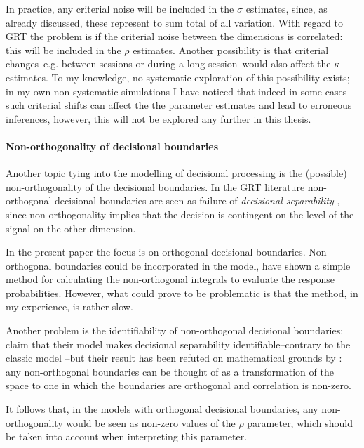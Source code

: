 \documentclass{article}\usepackage{knitr}
\begin{document}
In practice, any criterial noise will be included in the $\sigma$ estimates, since, as already discussed, these represent to sum total of all variation. With regard to GRT the problem is if the criterial noise between the dimensions is correlated: this will be included in the $\rho$ estimates. Another possibility is that criterial changes--e.g. between sessions or during a long session--would also affect the $\kappa$ estimates. To my knowledge, no systematic exploration of this possibility exists; in my own non-systematic simulations I have noticed that indeed in some cases such criterial shifts can affect the the parameter estimates and lead to erroneous inferences, however, this will not be explored any further in this thesis. 

\paragraph{Non-orthogonality of decisional boundaries}

Another topic tying into the modelling of decisional processing is the (possible) non-orthogonality of the decisional boundaries. In the GRT literature non-orthogonal decisional boundaries are seen as failure of \textit{decisional separability} \citep{ashby2015}, since non-orthogonality implies that the decision is contingent on the level of the signal on the other dimension. 

In the present paper the focus is on orthogonal decisional boundaries. Non-orthogonal boundaries could be incorporated in the model, \cite{ennis2003} have shown a simple method for calculating the non-orthogonal integrals to evaluate the response probabilities. However, what could prove to be problematic is that the method, in my experience, is rather slow.  

Another problem is the identifiability of non-orthogonal decisional boundaries: \cite{soto2015} claim that their model makes decisional separability identifiable--contrary to the classic model \citep{silbert2013}--but their result has been refuted on mathematical grounds by \cite{silbert2016}: any non-orthogonal boundaries can be thought of as a transformation of the space to one in which the boundaries are orthogonal and correlation is non-zero. 

It follows that, in the models with orthogonal decisional boundaries, any non-orthogonality would be seen as non-zero values of the $\rho$ parameter, which should be taken into account when interpreting this parameter.
\end{document}
